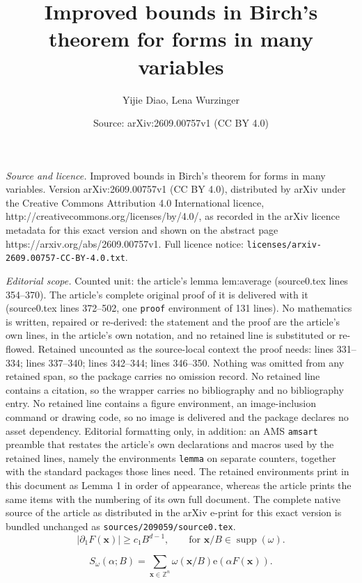 \documentclass[10pt,a4paper]{amsart}
\title{Improved bounds in Birch's theorem for forms in many variables}
\author{Yijie Diao, Lena Wurzinger}
\date{Source: arXiv:2609.00757v1 (CC BY 4.0)}
\newcommand{\ZZ}{\mathbb Z}
\newcommand{\e}{\mathrm e}
\newcommand{\x}{\mathbf{x}}
\begin{document}
\maketitle

\noindent\emph{Source and licence.} Improved bounds in Birch's theorem for forms in many variables. Version arXiv:2609.00757v1 (CC BY 4.0), distributed by arXiv under the Creative Commons Attribution 4.0 International licence, http://creativecommons.org/licenses/by/4.0/, as recorded in the arXiv licence metadata for this exact version and shown on the abstract page https://arxiv.org/abs/2609.00757v1. Full licence notice: \texttt{licenses/arxiv-2609.00757-CC-BY-4.0.txt}.\par\smallskip

\noindent\textit{Editorial scope.} Counted unit: the article's lemma lem:average (source0.tex lines 354--370). The article's complete original proof of it is delivered with it (source0.tex lines 372--502, one \texttt{proof} environment of 131 lines). No mathematics is written, repaired or re-derived: the statement and the proof are the article's own lines, in the article's own notation, and no retained line is substituted or re-flowed.  Retained uncounted as the source-local context the proof needs: lines 331--334; lines 337--340; lines 342--344; lines 346--350.  Nothing was omitted from any retained span, so the package carries no omission record.  No retained line contains a citation, so the wrapper carries no bibliography and no bibliography entry.  No retained line contains a figure environment, an image-inclusion command or drawing code, so no image is delivered and the package declares no asset dependency.  Editorial formatting only, in addition: an AMS \texttt{amsart} preamble that restates the article's own declarations and macros used by the retained lines, namely the environments \texttt{lemma} on separate counters, together with the standard packages those lines need.  The retained environments print in this document as Lemma 1 in order of appearance, whereas the article prints the same items with the numbering of its own full document.  The complete native source of the article as distributed in the arXiv e-print for this exact version is bundled unchanged as \texttt{sources/209059/source0.tex}.
\begin{equation}\label{eq:lower-bound-partial-F}
 |\partial_1F(\x)|\geq c_1B^{d-1},
 \qquad\text{for }\x/B\in\operatorname{supp}(\omega).
\end{equation}

\begin{equation}\label{eq:exponential-sum}
 S_\omega(\alpha;B)=\sum_{\x\in\ZZ^n}\omega(\x/B)
 \e(\alpha F(\x)).
\end{equation}
\end{document}
